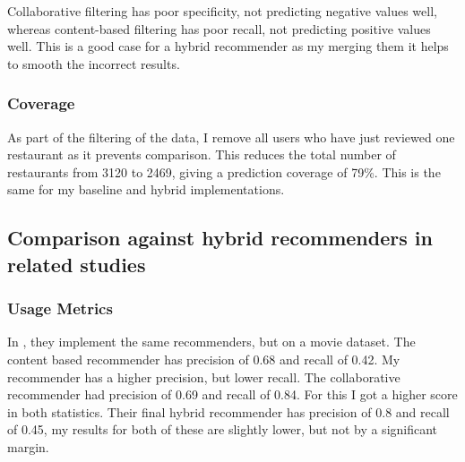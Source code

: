 \documentclass[conference]{IEEEtran}
\begin{document}
\begin{flushleft}
    
\end{flushleft}


Collaborative filtering has poor specificity, not predicting negative values well, whereas content-based filtering has poor recall, not predicting positive values well. This is a good case for a hybrid recommender as my merging them it helps to smooth the incorrect results.

\subsubsection{Coverage}

As part of the filtering of the data, I remove all users who have just reviewed one restaurant as it prevents comparison. This reduces the total number of restaurants from 3120 to 2469, giving a prediction coverage of 79\%. This is the same for my baseline and hybrid implementations.

\subsection{Comparison against hybrid recommenders in related studies}

\subsubsection{Usage Metrics}

In \cite{evaluation}, they implement the same recommenders, but on a movie dataset. The content based recommender has precision of 0.68 and recall of 0.42. My recommender has a higher precision, but lower recall. The collaborative recommender had precision of 0.69 and recall of 0.84. For this I got a higher score in both statistics. Their final hybrid recommender has precision of 0.8 and recall of 0.45, my results for both of these are slightly lower, but not by a significant margin.
\end{document}
